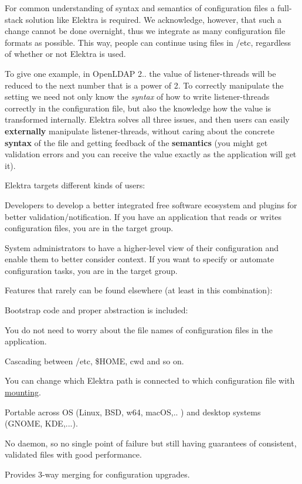 For common understanding of syntax and semantics of configuration files a full-\/stack solution like Elektra is required. We acknowledge, however, that such a change cannot be done overnight, thus we integrate as many configuration file formats as possible. This way, people can continue using files in {\ttfamily /etc}, regardless of whether or not Elektra is used.

To give one example, in Open\+L\+D\+AP 2.. the value of {\ttfamily listener-\/threads} will be reduced to the next number that is a power of 2. To correctly manipulate the setting we need not only know the {\itshape syntax} of how to write listener-\/threads correctly in the configuration file, but also the knowledge how the value is transformed internally. Elektra solves all three issues, and then users can easily {\bfseries{externally}} manipulate {\ttfamily listener-\/threads}, without caring about the concrete {\bfseries{syntax}} of the file and getting feedback of the {\bfseries{semantics}} (you might get validation errors and you can receive the value exactly as the application will get it).

Elektra targets different kinds of users\+:


\begin{DoxyEnumerate}
\item Developers to develop a better integrated free software ecosystem and plugins for better validation/notification. If you have an application that reads or writes configuration files, you are in the target group.
\item System administrators to have a higher-\/level view of their configuration and enable them to better consider context. If you want to specify or automate configuration tasks, you are in the target group.
\end{DoxyEnumerate}

Features that rarely can be found elsewhere (at least in this combination)\+:


\begin{DoxyItemize}
\item Bootstrap code and proper abstraction is included\+:
\begin{DoxyItemize}
\item You do not need to worry about the file names of configuration files in the application.
\item Cascading between {\ttfamily /etc}, {\ttfamily \$\+H\+O\+ME}, {\ttfamily cwd} and so on.
\item You can change which Elektra path is connected to which configuration file with \mbox{\hyperlink{doc_help_elektra-mounting_md}{mounting}}.
\item Portable across OS (Linux, B\+SD, w64, mac\+OS,.. ) and desktop systems (G\+N\+O\+ME, K\+DE,...).
\end{DoxyItemize}
\item No daemon, so no single point of failure but still having guarantees of consistent, validated files with good performance.
\item Provides 3-\/way merging for configuration upgrades.
\end{DoxyItemize}


